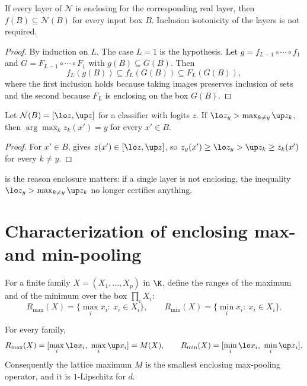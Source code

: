 \begin{theorem}\label{thm:net}
If every layer of $\mathcal N$ is enclosing for the corresponding real layer, then $f(B)\subseteq\mathcal N(B)$ for every input box $B$. Inclusion isotonicity of the layers is not required.
\end{theorem}

\begin{proof}
By induction on $L$. The case $L=1$ is the hypothesis. Let $g=f_{L-1}\circ\cdots\circ f_1$ and $G=F_{L-1}\circ\cdots\circ F_1$ with $g(B)\subseteq G(B)$. Then
\[
f_L(g(B))\subseteq f_L(G(B))\subseteq F_L(G(B)),
\]
where the first inclusion holds because taking images preserves inclusion of sets and the second because $F_L$ is enclosing on the box $G(B)$.
\end{proof}

\begin{corollary}[Certification]\label{cor:cert}
Let $\mathcal N(B)=[\lo z,\up z]$ for a classifier with logits $z$. If $\lo z_y>\max_{k\ne y}\up z_k$, then $\arg\max_kz_k(x')=y$ for every $x'\in B$.
\end{corollary}

\begin{proof}
For $x'\in B$,  gives $z(x')\in[\lo z,\up z]$, so $z_y(x')\ge\lo z_y>\up z_k\ge z_k(x')$ for every $k\ne y$.
\end{proof}

 is the reason enclosure matters: if a single layer is not enclosing, the inequality $\lo z_y>\max_{k\ne y}\up z_k$ no longer certifies anything.

\section{Characterization of enclosing max- and min-pooling}
\label{sec:char}

For a finite family $X=(X_1,\dots,X_p)$ in $\K$, define the ranges of the maximum and of the minimum over the box $\prod_iX_i$:
\[
R_{\max}(X)=\{\max_ix_i:\ x_i\in X_i\},\qquad R_{\min}(X)=\{\min_ix_i:\ x_i\in X_i\}.
\]

\begin{proposition}\label{prop:lattice}
For every family,
\[
R_{\max}(X)=[\max_i\lo x_i,\ \max_i\up x_i]=M(X),\qquad R_{\min}(X)=[\min_i\lo x_i,\ \min_i\up x_i].
\]
Consequently the lattice maximum $M$ is the smallest enclosing max-pooling operator, and it is $1$-Lipschitz for $d$.
\end{proposition}

